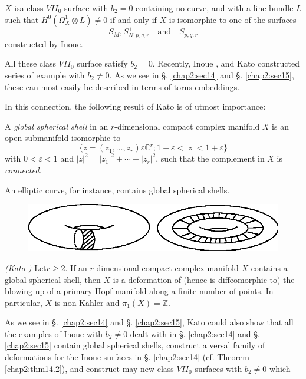 \begin{theorem*}
 $X$ is\pageoriginale a class $VII_0$ surface
with $b_2 = 0$
containing no curve, and
with a line bundle $L$ such that $H^0 (\Omega^1_X \otimes L) \neq 0$
if and only if $X$ is isomorphic to one of the surfaces  
$$
S_M, S^+_{N,p,q,r} \quad \text{and} \quad S^-_{p,q,r}
$$
constructed by Inoue.
\end{theorem*}

All these class $VII_0$ surface satisfy $b_2 = 0$. Recently, Inoue
\cite{keyI2}, \cite{keyI3} and Kato \cite{keyK2} constructed series of
example with  $b_2 
\neq 0$. As we see in \S. \ref{chap2:sec14} and \S. \ref{chap2:sec15},
these can most easily be 
described in terms of torus embeddings. 

In this connection, the following result of Kato \cite{keyK2} is of utmost
importance: 

\begin{defi*}
A \textit{global spherical shell}  in an $r$-dimensional compact complex
manifold $X$ is an open submanifold isomorphic to  
$$ 
\{ z = (z_1,\ldots, z_r) \varepsilon \mathbb{C}^r ; 1 - \varepsilon <  | z | <
1 + \varepsilon \} 
$$ 
with $0 < \varepsilon < 1$ and $|z|^2 = | z_1|^2 + \cdots + | z_r |^2$, such
that the complement in $X$ is \textit{connected}. 
 \end{defi*} 

An elliptic curve,  for instance, contains global spherical shells. 
 \begin{figure}[H]
\centering 
\includegraphics{vol58-fig/fig58-66.eps} 
\end{figure}

\begin{theorem*}{\em (Kato \cite{keyK2})}
 Let\pageoriginale $r \geq 2$. If an $r$-dimensional compact complex
  manifold $X$ contains a global spherical shell, then $X$ is a
  deformation of (hence is diffeomorphic to) the blowing up of a
  primary Hopf manifold along a finite number of points. In
  particular, $X$ is non-K\"ahler and $\pi_1 (X) = \mathbb{Z}$. 
\end{theorem*}

As we see in \S. \ref{chap2:sec14} and \S. \ref{chap2:sec15}, Kato
could also show that all the 
examples of Inoue with $b_2 \neq 0$ dealt  
with in \S. \ref{chap2:sec14} and \S. \ref{chap2:sec15} contain global
spherical shells, construct 
a versal family of deformations for the Inoue  
surfaces in \S. \ref{chap2:sec14} (cf. Theorem \ref{chap2:thm14.2}),
and construct may new class 
$VII_0$ surfaces with $b_2 \neq 0$ which 

